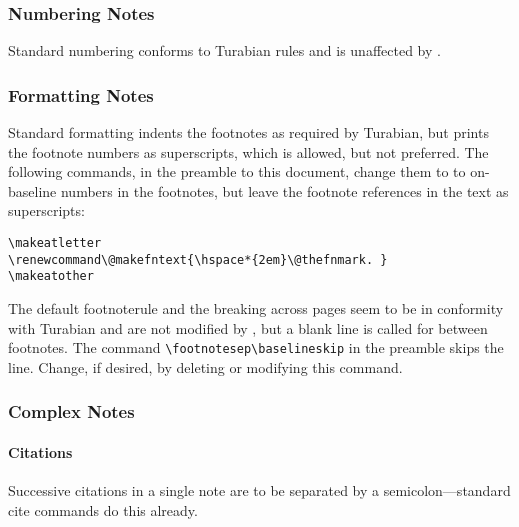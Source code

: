 \documentclass{ltxdockit}[2010/02/12]
\makeatletter
\renewcommand\@makefntext{\hspace*{2em}\@thefnmark. }
\makeatother
\begin{document}
\subsubsection{Numbering Notes}
Standard  numbering conforms to Turabian rules and is unaffected by .

\subsubsection{Formatting Notes}
Standard  formatting indents the footnotes as required by Turabian, but prints the footnote numbers as superscripts, which is allowed, but not preferred.
The following commands, in the preamble to this document, change them to to on-baseline numbers in the footnotes, but leave the footnote references in the text as superscripts:
\begin{verbatim}
\makeatletter
\renewcommand\@makefntext{\hspace*{2em}\@thefnmark. }
\makeatother
\end{verbatim}

The default footnoterule and the breaking across pages seem to be in conformity with Turabian and are not modified by , but a blank line is called for between footnotes. The command
\verb|\footnotesep\baselineskip|
in the preamble skips the line. Change, if desired, by deleting or modifying this command.

\subsubsection{Complex Notes}

\paragraph{Citations}
Successive citations in a single note are to be separated by a semicolon---standard  cite commands do this already.
\end{document}
